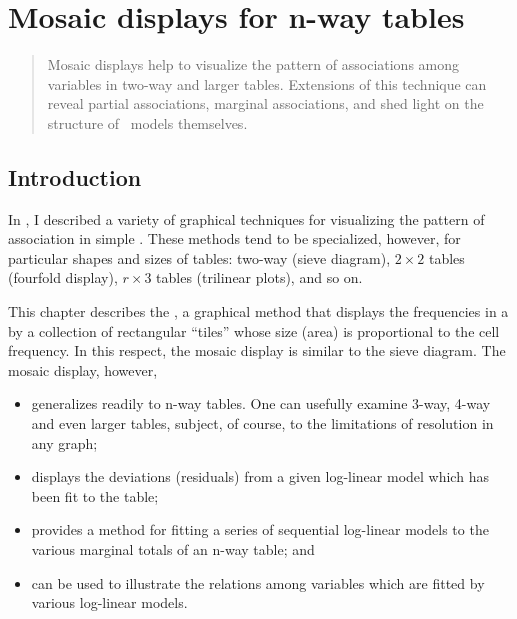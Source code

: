 \chapter{Mosaic displays for n-way tables}\label{ch:mosaic}

\begin{quote}
{\Large
Mosaic displays help to visualize the pattern of associations
among variables in two-way and larger tables.  Extensions of
this technique can reveal partial associations, marginal associations,
and shed light on the structure of \loglin\ models themselves. 
}
\end{quote}
\minitoc
\clearpage

\section{Introduction}\label{sec:mosaic-intro}

In , I described a variety of graphical techniques
for visualizing the pattern of association in simple \ctabs{}.
These methods tend to be specialized, however, for particular
shapes and sizes of tables: two-way (sieve diagram),
$2 \times 2$ tables (fourfold display), $r \times 3$ tables
(trilinear plots), and so on.

This chapter describes the
,
 a graphical method that displays the
frequencies in a \ctab{} by a collection of rectangular ``tiles''
whose size (area) is proportional to the cell frequency.
In this respect, the mosaic display is similar to the sieve diagram.
The mosaic display, however,

\begin{itemize}
\item generalizes readily to n-way tables.  One can usefully examine
3-way, 4-way and even larger tables, subject, of course, to the limitations
of resolution in any graph;
\item displays the deviations (residuals) from a given log-linear model
which has been fit to the table;
\item provides a method for fitting a series of sequential log-linear
models to the various marginal totals of an n-way table; and
\item can be used to illustrate the relations among variables which
are fitted by various log-linear models.
\end{itemize}











